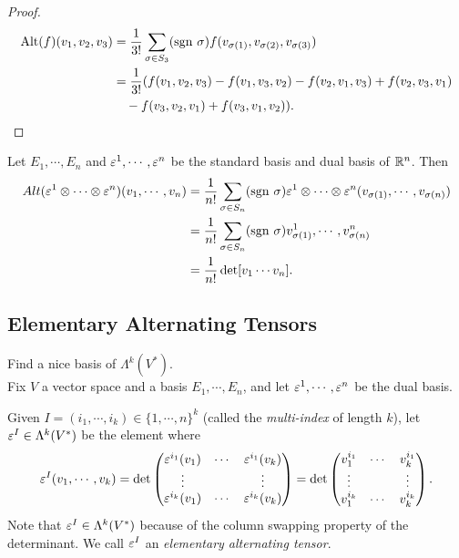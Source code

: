 \begin{proof}
    \begin{align*}
    \mathrm{Alt}(f)(v_1,v_2,v_3)
    &= \frac{1}{3!}\sum_{\sigma \in S_3}(\mathrm{sgn~} \sigma)f(v_{\sigma(1)},v_{\sigma(2)},v_{\sigma(3)}) \\
    &= \frac{1}{3!}(f(v_1,v_2,v_3) - f(v_1,v_3,v_2) - f(v_2,v_1,v_3) + f(v_2,v_3,v_1) \\
    &\quad-f(v_3,v_2,v_1) + f(v_3,v_1,v_2)).
    \end{align*}
\end{proof}
\begin{example}
    Let $E_1, \cdots, E_n$ and $\varepsilon^1,\cdots, \varepsilon^n$ be the standard basis and dual basis of $\mathbb{R}^n$. Then 
    \begin{align*}
    Alt(\varepsilon^1 \otimes \cdots \otimes \varepsilon^n)(v_1,\cdots,v_n) 
    &= \frac{1}{n!}\sum_{\sigma \in S_n}(\mathrm{sgn~} \sigma) \varepsilon^1 \otimes \cdots \otimes \varepsilon^n (v_{\sigma(1)}, \cdots, v_{\sigma(n) }) \\
    &=  \frac{1}{n!}\sum_{\sigma \in S_n}(\mathrm{sgn~} \sigma)
    v_{\sigma(1)}^1, \cdots, v_{\sigma(n)}^n \\
    &= \frac{1}{n!}\det [v_1 \cdots v_n].
    \end{align*}
\end{example}
\subsection{Elementary Alternating Tensors}
 Find a nice basis of $\Lambda^k(V^*)$. \\
Fix $V$ a vector space and a basis $E_1, \cdots, E_n$, and let $\varepsilon^1, \cdots, \varepsilon^n$ be the dual basis. 
\begin{definition}
Given $I = (i_1,\cdots,i_k) \in \{1,\cdots,n\}^k$ (called the \textit{multi-index} of length $k$), 
let $\varepsilon^I \in \Lambda^k(V^*)$ be the element where 
$$\varepsilon^I(v_1,\cdots,v_k) = \det \begin{pmatrix}
\varepsilon^{i_1}(v_1) & \cdots & \varepsilon^{i_1}(v_k) \\
\vdots & & \vdots \\
\varepsilon^{i_k}(v_1) & \cdots & \varepsilon^{i_k}(v_k) \end{pmatrix}
= \det \begin{pmatrix}
v_1^{i_1} & \cdots & v_k^{i_1} \\
\vdots & & \vdots \\
v_1^{i_k} & \cdots & v_k^{i_k} \end{pmatrix}.$$
Note that $\varepsilon^I \in \Lambda^k(V^*)$ because of the column swapping property of the determinant. We call $\varepsilon^I$ an \textit{elementary alternating tensor}.
\end{definition}

